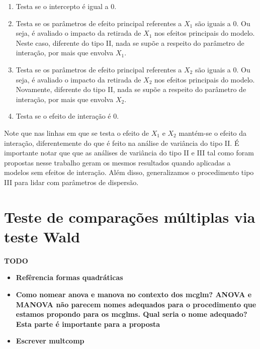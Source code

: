 \begin{enumerate}
  \item Testa se o intercepto é igual a 0.
  
  \item Testa se os parâmetros de efeito principal referentes a $X_1$ são iguais a 0. Ou seja, é avaliado o impacto da retirada de $X_1$ nos efeitos principais do modelo. Neste caso, diferente do tipo II, nada se supõe a respeito do parâmetro de interação, por mais que envolva $X_1$.
  
  \item Testa se os parâmetros de efeito principal referentes a $X_2$ são iguais a 0. Ou seja, é avaliado o impacto da retirada de $X_2$ nos efeitos principais do modelo. Novamente, diferente do tipo II, nada se supõe a respeito do parâmetro de interação, por mais que envolva $X_2$.
  
  \item Testa se o efeito de interação é 0.
\end{enumerate}

Note que nas linhas em que se testa o efeito de $X_1$ e $X_2$ mantém-se o efeito da interação, diferentemente do que é feito na análise de variância do tipo II. É importante notar que que as análises de variância do tipo II e III tal como foram propostas nesse trabalho geram os mesmos resultados quando aplicadas a modelos sem efeitos de interação. Além disso, generalizamos o procedimento tipo III para lidar com parâmetros de dispersão.


\section{Teste de comparações múltiplas via teste Wald}



\vspace{2cm}

\textbf{TODO}

\begin{itemize}
  
  \item \textbf{Refêrencia formas quadráticas}
  
  \item \textbf{Como nomear anova e manova no contexto dos mcglm? ANOVA e MANOVA não parecem nomes adequados para o procedimento que estamos propondo para os mcglms. Qual seria o nome adequado? Esta parte é importante para a proposta}

  \item \textbf{Escrever multcomp}
  
\end{itemize}



